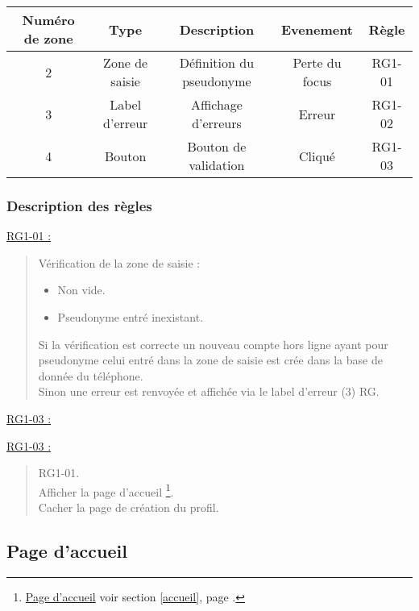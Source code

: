 \documentclass{report}
\begin{document}
			\begin{tabular}{|c|c|c|c|c|} \hline
				Numéro de zone & Type  & Description & Evenement &	Règle \\\hline 
				2 & Zone de saisie & Définition du pseudonyme & Perte du focus & RG1-01 \\\hline
				3 & Label d'erreur & Affichage d'erreurs      & Erreur         & RG1-02
				\\\hline 4 & Bouton         & Bouton de validation     & Cliqué & RG1-03 \\\hline
			\end{tabular}

		\subsubsection{Description des règles}
		
		\underline{RG1-01 :}
			\begin{quote}
				Vérification de la zone de saisie :
				\begin{itemize}
				  \item Non vide.
				  \item Pseudonyme entré inexistant.
				\end{itemize}
				Si la vérification est correcte un nouveau compte hors ligne ayant pour
				pseudonyme celui entré dans la zone de saisie est crée dans la base de donnée
				du téléphone.\\
				Sinon une erreur est renvoyée et affichée via le label d'erreur (3) RG.
			\end{quote}
			
		\underline{RG1-03 :}
			\begin{quote}
			
			\end{quote}		

		\underline{RG1-03 :}
			\begin{quote}
				RG1-01.\\
				Afficher la page d'accueil%
					\footnote[1]{
						\hyperlink{Page d'accueil}{Page d'accueil}
						\og voir section \ref{accueil}, page \pageref{accueil}.\fg
					}.\\
				Cacher la page de création du profil.
			\end{quote}
	
\newpage

	\subsection{Page d'accueil}
		\hypertarget{Page d'accueil}{}
		\label{accueil}
	
\end{document}
